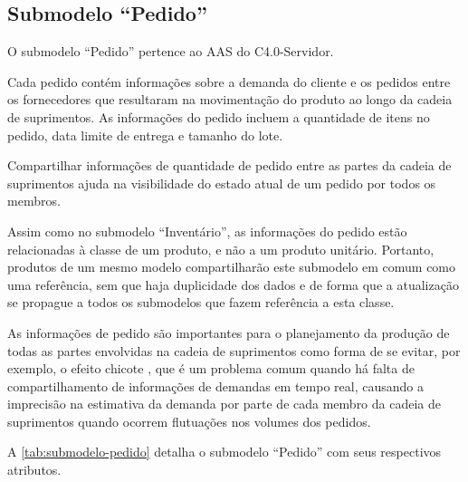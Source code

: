 \subsection{Submodelo ``Pedido''}

O submodelo ``Pedido'' pertence ao AAS do C4.0-Servidor.

Cada pedido contém informações sobre a demanda do cliente e os pedidos entre os fornecedores que resultaram na movimentação do produto ao longo da cadeia de suprimentos. As informações do pedido incluem a quantidade de itens no pedido, data limite de entrega e tamanho do lote.

Compartilhar informações de quantidade de pedido entre as partes da cadeia de suprimentos ajuda na visibilidade do estado atual de um pedido por todos os membros.

Assim como no submodelo ``Inventário'', as informações do pedido estão relacionadas à classe de um produto, e não a um produto unitário. Portanto, produtos de um mesmo modelo compartilharão este submodelo em comum como uma referência, sem que haja duplicidade dos dados e de forma que a atualização se propague a todos os submodelos que fazem referência a esta classe.

As informações de pedido são importantes para o planejamento da produção de todas as partes envolvidas na cadeia de suprimentos como forma de se evitar, por exemplo, o efeito chicote \cite{lee1997bullwhip}, que é um problema comum quando há falta de compartilhamento de informações de demandas em tempo real, causando a imprecisão na estimativa da demanda por parte de cada membro da cadeia de suprimentos quando ocorrem flutuações nos volumes dos pedidos.

A \autoref{tab:submodelo-pedido} detalha o submodelo ``Pedido'' com seus respectivos atributos.

